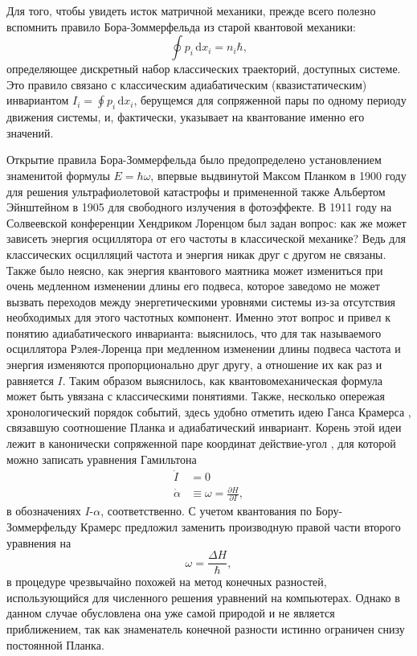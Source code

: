 \documentclass[14pt, a4paper]{extreport}
\newcommand{\diff}{\,\mathrm{d}}
\numberwithin{equation}{section}
\begin{document}
Для того, чтобы увидеть исток матричной механики, прежде всего полезно вспомнить правило Бора-Зоммерфельда из старой квантовой механики:
\begin{equation}
	\oint p_i \diff x_i = n_i \hbar, \label{eq:bohr-sommerfeld}
\end{equation}
определяющее дискретный набор классических траекторий, доступных системе. Это правило связано с классическим адиабатическим (квазистатическим) инвариантом $I_i = \oint p_i \diff x_i$, берущемся для сопряженной пары по одному периоду движения системы, и, фактически, указывает на квантование именно его значений. 

Открытие правила Бора-Зоммерфельда было предопределено установлением знаменитой формулы $E = \hbar \omega$, впервые выдвинутой Максом Планком в 1900 году для решения ультрафиолетовой катастрофы и примененной также Альбертом Эйнштейном в 1905 для свободного излучения в фотоэффекте. В 1911 году на Солвеевской конференции Хендриком Лоренцом был задан вопрос: как же может зависеть энергия осциллятора от его частоты в классической механике? Ведь для классических осцилляций частота и энергия никак друг с другом не связаны. Также было неясно, как энергия квантового маятника может измениться при очень медленном изменении длины его подвеса, которое заведомо не может вызвать переходов между энергетическими уровнями системы из-за отсутствия необходимых для этого частотных компонент. Именно этот вопрос и привел к понятию адиабатического инварианта: выяснилось, что для так называемого осциллятора Рэлея-Лоренца при медленном изменении длины подвеса частота и энергия изменяются пропорционально друг другу, а отношение их как раз и равняется $I$. Таким образом выяснилось, как квантовомеханическая формула может быть увязана с классическими понятиями. Также, несколько опережая хронологический порядок событий, здесь удобно отметить идею Ганса Крамерса \cite{kramers1924quantum}, связавшую соотношение Планка и адиабатический инвариант. Корень этой идеи лежит в канонически сопряженной паре координат действие-угол \cite{shmutzer1976}, для которой можно записать уравнения Гамильтона
\begin{align}
	\dot I &= 0 \\
	\dot \alpha &\equiv \omega = \frac{\partial H }{\partial I},
\end{align}
в обозначениях $I$-$\alpha$, соответственно. С учетом квантования по Бору\hyp Зоммерфельду Крамерс предложил заменить производную правой части второго уравнения на
\begin{equation}
	\omega = \frac{\Delta H}{\hbar},
\end{equation}
в процедуре чрезвычайно похожей на метод конечных разностей, использующийся для численного решения уравнений на компьютерах. Однако в данном случае обусловлена она уже самой природой и не является приближением, так как знаменатель конечной разности истинно ограничен снизу постоянной Планка.
\end{document}
